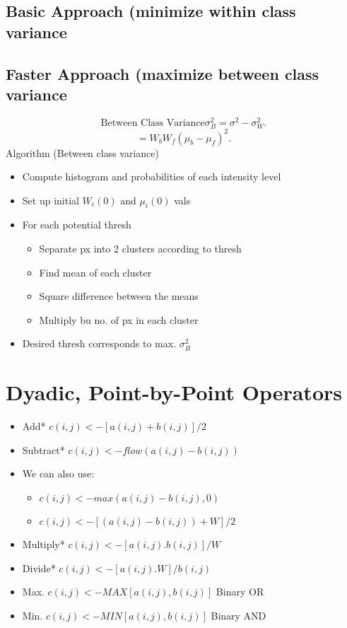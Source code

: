 \documentclass[a4paper]{article}
\begin{document}
	\subsection{Basic Approach (minimize within class variance}
	\subsection{Faster Approach (maximize between class variance}
	\[
		\text{Between Class Variance} \sigma_B^2 = \sigma^2-\sigma_W^2
	.\]
	\[
		= W_bW_f(\mu_b-\mu_f)^2
	.\]
	Algorithm (Between class variance)
	\begin{itemize}
		\item Compute histogram and probabilities of each intensity
			level
		\item Set up initial $W_i(0)$ and $\mu_i(0)$ vals
		\item For each potential thresh
		\begin{itemize}
			\item Separate px into 2 clusters according to thresh
			\item Find mean of each cluster
			\item Square difference between the means
			\item Multiply bu no. of px in each cluster
		\end{itemize}
		\item Desired thresh corresponds to max. $\sigma_B^2$
	\end{itemize}
	\section{Dyadic, Point-by-Point Operators}
	\begin{itemize}
		\item Add* $c(i,j) <- [a(i,j)+b(i,j)]/2$
		\item Subtract* $c(i,j) <- flow(a(i,j)-b(i,j))$
		\item We can also use:
		\begin{itemize}
			\item $c(i,j) <- max(a(i,j)-b(i,j),0)$
			\item $c(i,j) <- [(a(i,j)-b(i,j))+W]/2$
		\end{itemize}
	\item Multiply* $c(i,j) <- [a(i,j).b(i,j)]/W$
        \item Divide* $c(i,j) <- [a(i,j).W]/b(i,j)$
	\item Max. $c(i,j) <- MAX[a(i,j),b(i,j)]$ Binary OR
	\item Min. $c(i,j) <- MIN[a(i,j),b(i,j)]$ Binary AND
	\end{itemize}
\end{document}

